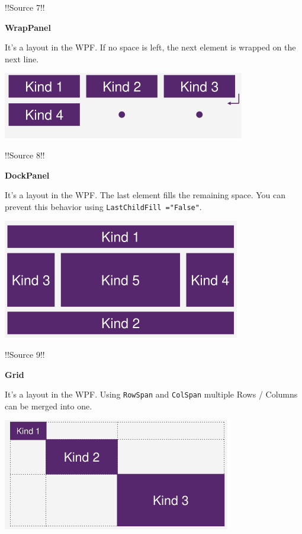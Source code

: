 \documentclass[10pt,twoside,landscape]{article}
\begin{document}
\begin{multicols}{4}
!!Source 7!!

\textbf{WrapPanel}

It's a layout in the WPF.
If no space  is left, the next element is wrapped on the next line.

\begin{center}
\includegraphics[width=.9\linewidth]{img/wrap_panel_horizontal.png}
\end{center}

!!Source 8!!

\textbf{DockPanel}

It's a layout in the WPF.
The last element fills the remaining space.
You can prevent this behavior using \texttt{LastChildFill ="False"}.

\begin{center}
\includegraphics[width=.9\linewidth]{img/dockpanel_version_one.png}
\end{center}

!!Source 9!!

\textbf{Grid}

It's a layout in the WPF.
Using \texttt{RowSpan} and \texttt{ColSpan} multiple Rows / Columns can be merged into one.

\begin{center}
\includegraphics[width=.9\linewidth]{img/grid_layout.png}
\end{center}


\end{multicols}
\end{document}
